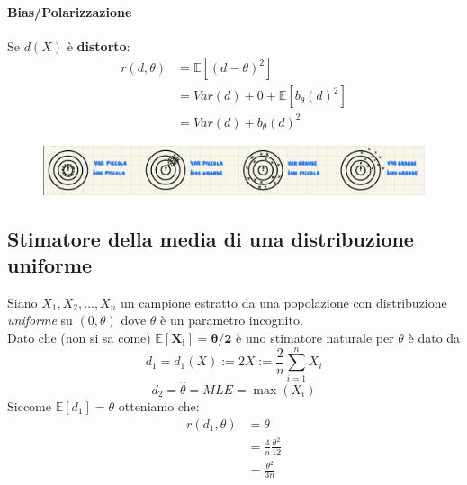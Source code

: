 \documentclass[]{article}
\newcommand{\ev}{\mathbb{E}[X]}
\renewcommand{\ev}[1]{\mathbb{E}[#1]}
\begin{document}
    \paragraph{Bias/Polarizzazione}
    Se $d(X)$ è \textbf{distorto}:
    \begin{equation*}
        \begin{split}
            r(d, \theta) &= \ev{(d - \theta)^2} \\
            &= Var(d) + 0 + \ev{b_\theta (d)^2} \\
            &= Var(d) + b_\theta(d)^2
        \end{split}
    \end{equation*}
    \begin{figure}[h]
        \includegraphics[width=\textwidth]{images/boh_4.png}    
    \end{figure}
    \subsection{Stimatore della media di una distribuzione uniforme}
    Siano $X_1, X_2, \ldots, X_n$ un campione estratto da una popolazione con distribuzione \textit{uniforme} su $(0, \theta)$ dove $\theta$ è un parametro incognito. \\
    Dato che (non si sa come) $\boldsymbol{\ev{X_i} = \theta / 2}$ è uno stimatore naturale per $\theta$ è dato da
    \[ d_1 = d_1 (X) := 2 \overline{X} := \frac{2}{n} \displaystyle\sum_{i=1}^{n} X_i \]
    \[ d_2 = \hat{\theta} = MLE = \max(X_i) \]
    Siccome $\ev{d_1} = \theta$ otteniamo che:
    \begin{equation*}
        \begin{split}
            r(d_1, \theta) &= \theta \\
            &= \frac{4}{n} \frac{\theta^2}{12} \\
            &= \frac{\theta^2}{3n}
        \end{split}
    \end{equation*}
\end{document}
